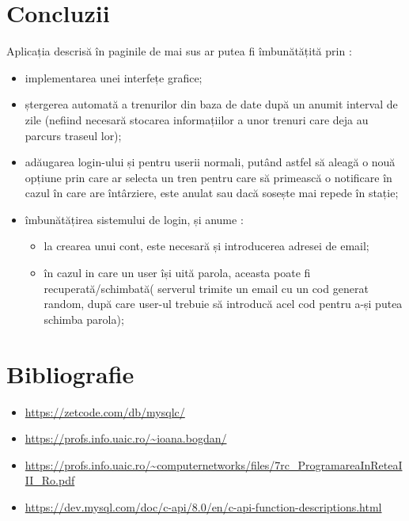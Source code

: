 \documentclass[runningheads]{llncs}
\begin{document}
	\section{Concluzii}
	Aplicația descrisă în paginile de mai sus ar putea fi îmbunătățită prin : 
	\begin{itemize}
		\item implementarea unei interfețe grafice;
		\item ștergerea automată a trenurilor din baza de date după un anumit interval de zile (nefiind necesară stocarea informațiilor a unor trenuri care deja au parcurs traseul lor);
		\item adăugarea login-ului și pentru userii normali, putând astfel să aleagă o nouă opțiune prin care ar selecta un tren pentru care să primească o notificare în cazul în care are întârziere, este anulat sau dacă sosește mai repede în stație;
		\item îmbunătățirea sistemului de login, și anume :
		\begin{itemize}
			\item la crearea unui cont, este necesară și introducerea adresei de email;
			\item în cazul in care un user își uită parola, aceasta poate fi recuperată/schimbată( serverul trimite un email cu un cod generat random, după care user-ul trebuie să introducă acel cod pentru a-și putea schimba parola);
		\end{itemize}
	\end{itemize}
	\section{Bibliografie}
	\begin{itemize}
		\item \url{https://zetcode.com/db/mysqlc/}
		\item \url{https://profs.info.uaic.ro/~ioana.bogdan/}
		\item \url{https://profs.info.uaic.ro/~computernetworks/files/7rc_ProgramareaInReteaIII_Ro.pdf}
		\item \url{https://dev.mysql.com/doc/c-api/8.0/en/c-api-function-descriptions.html}
		
	\end{itemize}
	
	
\end{document}
